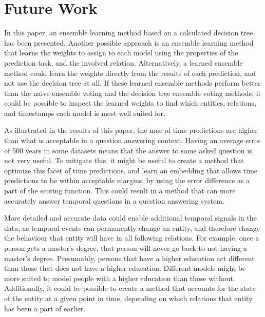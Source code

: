 \section{Future Work}
\label{sec:future-work}

In this paper, an ensemble learning method based on a calculated decision tree has been presented. Another possible approach is an ensemble learning method that learns the weights to assign to each model using the properties of the prediction task, and the involved relation. Alternatively, a learned ensemble method could learn the weights directly from the results of each prediction, and not use the decision tree at all. If these learned ensemble methods perform better than the naive ensemble voting and the decision tree ensemble voting methods, it could be possible to inspect the learned weights to find which entities, relations, and timestamps each model is most well suited for.

As illustrated in the results of this paper, the \gls{mae} of time predictions are higher than what is acceptable in a question answering context. Having an average error of 500 years in some datasets means that the answer to some asked question is not very useful. To mitigate this, it might be useful to create a method that optimize this facet of time predictions, and learn an embedding that allows time predictions to be within acceptable margins, by using the error difference as a part of the scoring function. This could result in a method that can more accurately answer temporal questions in a question answering system.

More detailed and accurate data could enable additional temporal signals in the data, as temporal events can permanently change an entity, and therefore change the behaviour that entity will have in all following relations. For example, once a person gets a master's degree, that person will never go back to not having a master's degree. Presumably, persons that have a higher education act different than those that does not have a higher education. Different models might be more suited to model people with a higher education than those without. Additionally, it could be possible to create a method that accounts for the state of the entity at a given point in time, depending on which relations that entity has been a part of earlier.


